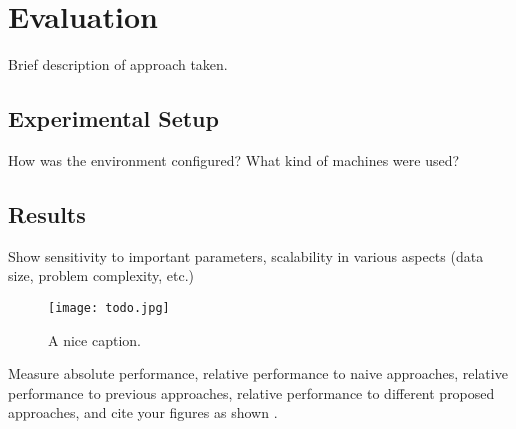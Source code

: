 \section{Evaluation}\label{sec:eval}
Brief description of approach taken.

\subsection{Experimental Setup}
How was the environment configured?
What kind of machines were used?

\subsection{Results}
Show sensitivity to important parameters, scalability in various aspects (data
size, problem complexity, etc.)

\begin{figure*}[h!]
  \centering
  \texttt{[image: todo.jpg]}
  \caption{A nice caption.}\label{fig:todo}
\end{figure*}

Measure absolute performance, relative performance to naive approaches,
relative performance to previous approaches, relative performance to different
proposed approaches, and cite your figures as shown .